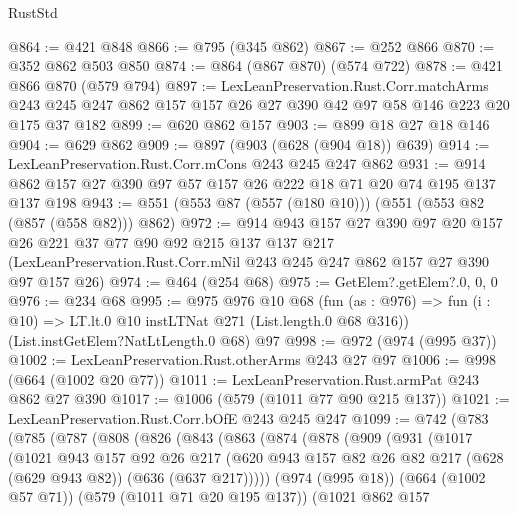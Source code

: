 \begin{lexlean}{RustStd}
\begin{coremodule}
@864 := @421 @848
@866 := @795 (@345 @862)
@867 := @252 @866
@870 := @352 @862 @503 @850
@874 := @864 (@867 @870) (@574 @722)
@878 := @421 @866 @870 (@579 @794)
@897 := LexLeanPreservation.Rust.Corr.matchArms
    @243
    @245
    @247
    @862
    @157
    @157
    @26
    @27
    @390
    @42
    @97
    @58
    @146
    @223
    @20
    @175
    @37
    @182
@899 := @620 @862 @157
@903 := @899 @18 @27 @18 @146
@904 := @629 @862
@909 := @897 (@903 (@628 (@904 @18)) @639)
@914 := LexLeanPreservation.Rust.Corr.mCons @243 @245 @247 @862
@931 := @914 @862 @157 @27 @390 @97 @57 @157 @26 @222 @18 @71 @20 @74 @195 @137 @137 @198
@943 := @551 (@553 @87 (@557 (@180 @10))) (@551 (@553 @82 (@857 (@558 @82))) @862)
@972 := @914
    @943
    @157
    @27
    @390
    @97
    @20
    @157
    @26
    @221
    @37
    @77
    @90
    @92
    @215
    @137
    @137
    @217
    (LexLeanPreservation.Rust.Corr.mNil @243 @245 @247 @862 @157 @27 @390 @97 @157 @26)
@974 := @464 (@254 @68)
@975 := GetElem?.getElem?.{0, 0, 0}
@976 := @234 @68
@995 := @975
    @976
    @10
    @68
    (fun (as : @976) => fun (i : @10) => LT.lt.{0} @10 instLTNat @271 (List.length.{0} @68 @316))
    (List.instGetElem?NatLtLength.{0} @68)
    @97
@998 := @972 (@974 (@995 @37))
@1002 := LexLeanPreservation.Rust.otherArms @243 @27 @97
@1006 := @998 (@664 (@1002 @20 @77))
@1011 := LexLeanPreservation.Rust.armPat @243 @862 @27 @390
@1017 := @1006 (@579 (@1011 @77 @90 @215 @137))
@1021 := LexLeanPreservation.Rust.Corr.bOfE @243 @245 @247
@1099 := @742
    (@783
      (@785
        (@787
          (@808
            (@826
              (@843
                (@863
                  (@874
                    (@878
                      (@909
                        (@931
                          (@1017
                            (@1021
                              @943
                              @157
                              @92
                              @26
                              @217
                              (@620
                                @943
                                @157
                                @82
                                @26
                                @82
                                @217
                                (@628 (@629 @943 @82))
                                (@636 (@637 @217)))))
                          (@974 (@995 @18))
                          (@664 (@1002 @57 @71))
                          (@579 (@1011 @71 @20 @195 @137))
                          (@1021
                            @862
                            @157

\end{coremodule}
\end{lexlean}
